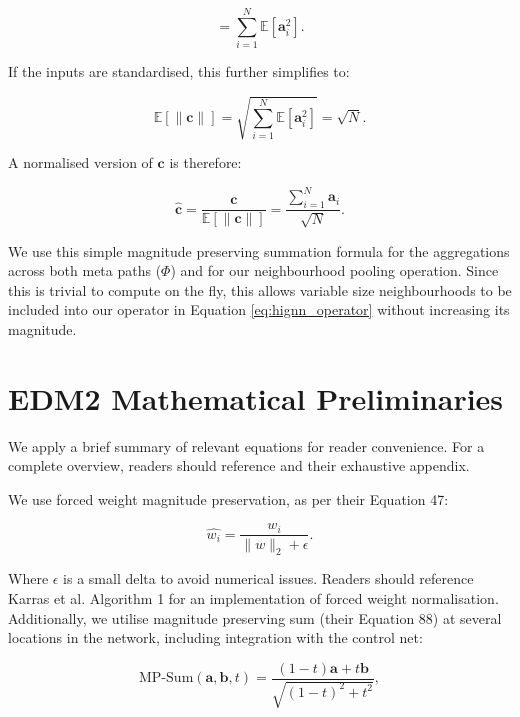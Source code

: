 \begin{equation}
= \sum_{i=1}^{N} \mathbb{E}[\mathbf{a}_i^2].
\end{equation}

If the inputs are standardised, this further simplifies to:

\begin{equation}
\mathbb{E}[\|\mathbf{c}\|] = \sqrt{\sum_{i=1}^{N} \mathbb{E}[\mathbf{a}_i^2]} = \sqrt{N}.
\end{equation}

A normalised version of \(\mathbf{c}\) is therefore: 

\begin{equation}
\hat{\mathbf{c}} = \frac{\mathbf{c}}{\mathbb{E}[\|\mathbf{c}\|]} = \frac{\sum_{i=1}^{N} \mathbf{a}_i}{\sqrt{N}}.
\label{eq:normalised_c}
\end{equation}

We use this simple magnitude preserving summation formula for the aggregations across both meta paths ($\Phi$) and for our neighbourhood pooling operation. Since this is trivial to compute on the fly, this allows variable size neighbourhoods to be included into our operator in Equation \ref{eq:hignn_operator} without increasing its magnitude.

\section{EDM2 Mathematical Preliminaries}
\label{appendix:edm2_preliminaries}

We apply a brief summary of relevant equations for reader convenience. For a complete overview, readers should reference \cite{karras_analyzing_2024} and their exhaustive appendix.

We use forced weight magnitude preservation, as per their Equation 47:

\begin{equation}
\hat{w_i} = \frac{w_i}{\|w\|_2 + \epsilon}.
 \label{eq:karras_47}
\end{equation}

Where $\epsilon$ is a small delta to avoid numerical issues. Readers should reference Karras et al. Algorithm 1 for an implementation of forced weight normalisation. Additionally, we utilise magnitude preserving sum (their Equation 88) at several locations in the network, including integration with the control net:

\begin{equation}
\text{MP-Sum}(\mathbf{a}, \mathbf{b}, t) = \frac{(1 - t) \mathbf{a} + t \mathbf{b}}{\sqrt{(1 - t)^2 + t^2}},
 \label{eq:mp_sum}
\end{equation}

